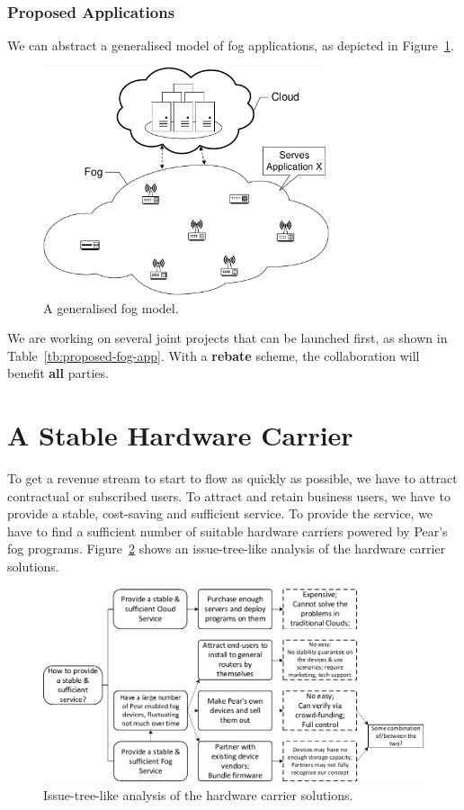 \subsubsection{Proposed Applications}
We can abstract a generalised model of fog applications, as depicted in Figure~\ref{fig:fog-generalised-model}. 

\begin{figure}[ht]
	\centering
	\includegraphics[width=0.75\textwidth]{fig/fog-models/model.pdf}
	\caption{A generalised fog model.}\label{fig:fog-generalised-model}
\end{figure}

We are working on several joint projects that can be launched first, as shown in Table~\ref{tb:proposed-fog-app}. With a \textbf{rebate} scheme, the collaboration will benefit \textbf{all} parties.  

\section{A Stable Hardware Carrier} \label{sec-stable-carrier}%
To get a revenue stream to start to flow as quickly as possible, we have to attract contractual or subscribed users. To attract and retain business users, we have to provide a stable, cost-saving and sufficient service. To provide the service, we have to find a sufficient number of suitable hardware carriers powered by Pear's fog programs. Figure~\ref{fig:issue-tree-fog-nodes} shows an issue-tree-like analysis of the hardware carrier solutions. 
\begin{figure}[ht]
	\centering
	\includegraphics[width=1.0\textwidth]{fig/decisions/issue-tree-fog-nodes.pdf}
	\caption{Issue-tree-like analysis of the hardware carrier solutions.}\label{fig:issue-tree-fog-nodes}
\end{figure}

